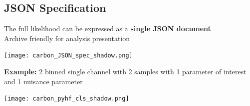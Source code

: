 \documentclass[a0paper,fleqn]{betterposter}
\newcommand{\fontsizeinstitution}{\fontsize{16}{25} \selectfont}
\begin{document}
{ \subsection{JSON Specification}
 The full likelihood can be expressed as a \textbf{single JSON document}\\
 Archive friendly for analysis presentation
 \vspace{0.5em}
 \begin{center}
  \texttt{[image: carbon\_JSON\_spec\_shadow.png]}
 \end{center}
 \vspace{-1em}
 \begin{center}
 {\fontsizeinstitution\textbf{Example:} 2 binned single channel with 2 samples with 1 parameter of interest and 1 nuisance parameter}
 \end{center}
 \begin{center}
  \texttt{[image: carbon\_pyhf\_cls\_shadow.png]}
 \end{center}

}
\end{document}
